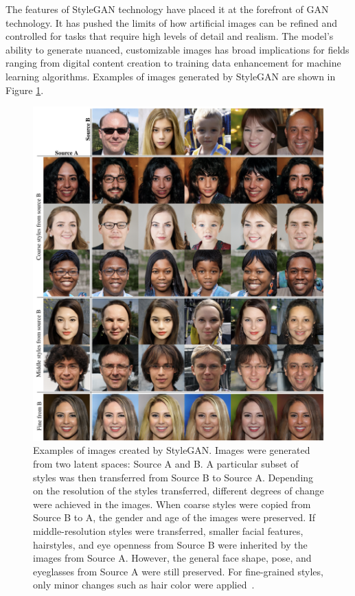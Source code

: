 The features of StyleGAN technology have placed it at the forefront of GAN technology. It has pushed the limits of how artificial images can be refined and controlled for tasks that require high levels of detail and realism. The model's ability to generate nuanced, customizable images has broad implications for fields ranging from digital content creation to training data enhancement for machine learning algorithms. Examples of images generated by StyleGAN are shown in Figure \ref{fig:styleGANExample}.

\begin{figure}[!htb]
    \centering
    \includegraphics[scale=0.6]{Images/style-gan-example.png}
    \caption{Examples of images created by StyleGAN. Images were generated from two latent spaces: Source A and B. A particular subset of styles was then transferred from Source B to Source A. Depending on the resolution of the styles transferred, different degrees of change were achieved in the images. When coarse styles were copied from Source B to A, the gender and age of the images were preserved. If middle-resolution styles were transferred, smaller facial features, hairstyles, and eye openness from Source B were inherited by the images from Source A. However, the general face shape, pose, and eyeglasses from Source A were still preserved. For fine-grained styles, only minor changes such as hair color were applied~\cite{cycleGANs}.}
    \label{fig:styleGANExample}
\end{figure}

